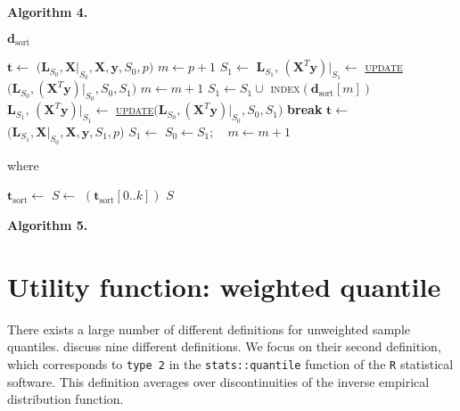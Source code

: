 \documentclass[a4paper,oneside,11pt,DIV=12]{scrartcl}
\newcommand{\code}[1]{{\texttt{#1}}}
\begin{document}
\vspace{1em}
\noindent \textbf{\sffamily Algorithm 4.}  
\begin{algorithmic}[1]
	\hypertarget{alg:alg4}{\Require $\bm d_{\mathrm{sort}}$} 
	\State $\bm t \gets$ $\big( \bm L_{S_0}, \bm X\vert_{S_0}, \bm X, \bm y, S_0, p\big)$
	\State $m \gets p + 1$
	\State $S_1 \gets$ 
		\State $\bm L_{S_1}, \, (\bm X^T  \bm y)\vert_{S_1} \gets$ \hyperlink{alg:update}{\textsc{update}}$\big(\bm L_{S_0}, (\bm X^T \bm y)\vert_{S_0}, S_0, S_1\big)$
				\State $m \gets m + 1$
				\State $S_1 \gets S_1 \cup$ \textsc{index}$(\bm d_{\mathrm{sort}}[m])$
				\State $\bm L_{S_1}, \, (\bm X^T  \bm y)\vert_{S_1} \gets$ \hyperlink{alg:update}{\textsc{update}}$\big(\bm L_{S_0}, (\bm X^T \bm y)\vert_{S_0}, S_0, S_1\big)$
					\State \textbf{break}
				\EndIf
			\EndWhile
		\EndIf
		\State $\bm t \gets$ $\big(\bm L_{S_1}, \bm X\vert_{S_0}, \bm X, \bm y, S_1, p\big)$
		\State $S_1 \gets$ 
		\State $S_0 \gets S_1; \quad m \gets m + 1$
		\EndWhile
\end{algorithmic}

\noindent where
\begin{algorithmic}[1]
		\State $\bm t_{\mathrm{sort}} \gets$  
		\State $S \gets$  $(\bm t_{\mathrm{sort}}[0..k])$
		\State \Return $S$ 
	\EndFunction
\end{algorithmic}




\vspace{1em}
\noindent \textbf{\sffamily Algorithm 5.}  





\section{Utility function: weighted quantile}\label{sec:utility}
There exists a large number of different definitions for unweighted sample quantiles. \citet{hyndman_fan_1996} discuss nine different definitions. We focus on their second definition, which corresponds to \code{type 2} in the \code{stats::quantile} function of the \code{R} statistical software. This definition averages over discontinuities of the inverse empirical distribution function. 
\end{document}

